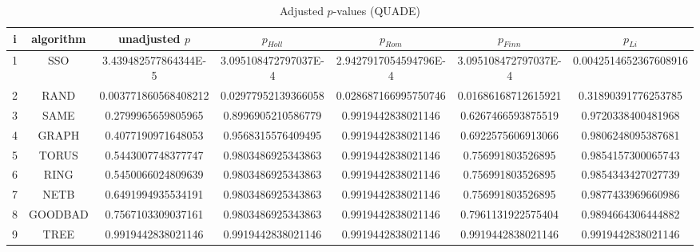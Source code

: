 \documentclass[a4paper,10pt]{article}
\begin{document}
\begin{landscape}
\begin{table}[!htp]
\centering\scriptsize
\caption{Adjusted $p$-values (QUADE)}
\begin{tabular}{ccccccc}
i&algorithm&unadjusted $p$&$p_{Holl}$&$p_{Rom}$&$p_{Finn}$&$p_{Li}$\\
\hline
1& SSO&3.439482577864344E-5&3.095108472797037E-4&2.9427917054594796E-4&3.095108472797037E-4&0.0042514652367608916\\
2& RAND&0.003771860568408212&0.02977952139366058&0.028687166995750746&0.01686168712615921&0.31890391776253785\\
3& SAME&0.2799965659805965&0.8996905210586779&0.9919442838021146&0.6267466593875519&0.9720338400481968\\
4& GRAPH&0.4077190971648053&0.9568315576409495&0.9919442838021146&0.6922575606913066&0.9806248095387681\\
5& TORUS&0.5443007748377747&0.9803486925343863&0.9919442838021146&0.756991803526895&0.9854157300065743\\
6& RING&0.5450066024809639&0.9803486925343863&0.9919442838021146&0.756991803526895&0.9854343427027739\\
7& NETB&0.6491994935534191&0.9803486925343863&0.9919442838021146&0.756991803526895&0.9877433969660986\\
8& GOODBAD&0.7567103309037161&0.9803486925343863&0.9919442838021146&0.7961131922575404&0.9894664306444882\\
9& TREE&0.9919442838021146&0.9919442838021146&0.9919442838021146&0.9919442838021146&0.9919442838021146\\
\hline
\end{tabular}
\end{table}

\end{landscape}
\end{document}
